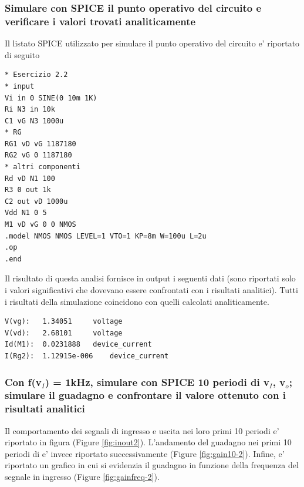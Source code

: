 \documentclass[a4paper,10pt]{article}
\begin{document}
\newpage

\subsubsection{Simulare con SPICE il punto operativo del circuito e verificare i valori trovati analiticamente}
Il listato SPICE utilizzato per simulare il punto operativo del circuito e' riportato di seguito
\begin{verbatim}
* Esercizio 2.2
* input
Vi in 0 SINE(0 10m 1K)
Ri N3 in 10k
C1 vG N3 1000u
* RG
RG1 vD vG 1187180
RG2 vG 0 1187180
* altri componenti
Rd vD N1 100
R3 0 out 1k
C2 out vD 1000u
Vdd N1 0 5
M1 vD vG 0 0 NMOS
.model NMOS NMOS LEVEL=1 VTO=1 KP=8m W=100u L=2u
.op
.end
\end{verbatim}
Il risultato di questa analisi fornisce in output i seguenti dati (sono riportati solo i valori significativi che dovevano essere confrontati con i risultati analitici). Tutti i risultati della simulazione coincidono con quelli calcolati analiticamente.
\begin{verbatim}
V(vg):	 1.34051	 voltage
V(vd):	 2.68101	 voltage
Id(M1):	 0.0231888	 device_current
I(Rg2):	 1.12915e-006	 device_current
\end{verbatim}
\newpage

\subsubsection{Con f(v$_I$) = 1kHz, simulare con SPICE 10 periodi di v$_I$, v$_o$; simulare il guadagno e confrontare il valore ottenuto con i risultati analitici}
Il comportamento dei segnali di ingresso e uscita nei loro primi 10 periodi e' riportato in figura (Figure \ref{fig:inout2}). L'andamento del guadagno nei primi 10 periodi di e' invece riportato successivamente (Figure \ref{fig:gain10-2}). Infine, e' riportato un grafico in cui si evidenzia il guadagno in funzione della frequenza del segnale in ingresso (Figure \ref{fig:gainfreq-2}).
\end{document}
